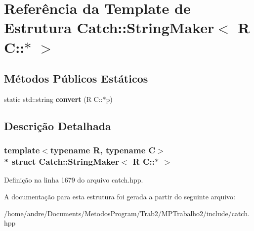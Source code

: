 \hypertarget{structCatch_1_1StringMaker_3_01R_01C_1_1_5_01_4}{}\section{Referência da Template de Estrutura Catch\+:\+:String\+Maker$<$ R C\+:\+:$\ast$ $>$}
\label{structCatch_1_1StringMaker_3_01R_01C_1_1_5_01_4}
\subsection*{Métodos Públicos Estáticos}
\begin{DoxyCompactItemize}
\item 
static std\+::string {\bfseries convert} (R C\+::$\ast$p)\hypertarget{structCatch_1_1StringMaker_3_01R_01C_1_1_5_01_4_af69c15e0b406e945777137fe4a333731}{}\label{structCatch_1_1StringMaker_3_01R_01C_1_1_5_01_4_af69c15e0b406e945777137fe4a333731}

\end{DoxyCompactItemize}


\subsection{Descrição Detalhada}
\subsubsection*{template$<$typename R, typename C$>$\\*
struct Catch\+::\+String\+Maker$<$ R C\+::$\ast$ $>$}



Definição na linha 1679 do arquivo catch.\+hpp.



A documentação para esta estrutura foi gerada a partir do seguinte arquivo\+:\begin{DoxyCompactItemize}
\item 
/home/andre/\+Documents/\+Metodos\+Program/\+Trab2/\+M\+P\+Trabalho2/include/catch.\+hpp\end{DoxyCompactItemize}
